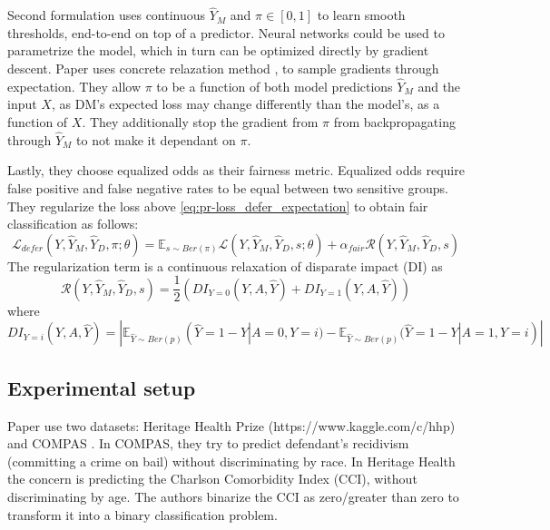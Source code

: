 \documentclass[11pt,a4paper,final]{article}
\begin{document}
Second formulation uses continuous $\hat{Y}_M$ and $\pi \in [0,1]$ to learn smooth thresholds, end-to-end on top of a predictor. Neural networks could be used to parametrize the model, which in turn can be optimized directly by gradient descent. Paper uses concrete relazation method \citep{jang2016categorical}, \citep{maddison2016concrete} to sample gradients through expectation. They allow $\pi$ to be a function of both model predictions $\hat{Y}_M$ and the input $X$, as DM's expected loss may change differently than the model's, as a function of $X$. They additionally stop the gradient from $\pi$ from backpropagating through $\hat{Y}_M$ to not make it dependant on $\pi$.

Lastly, they choose equalized odds \citep{hardt2016equality} as their fairness metric. Equalized odds require false positive and false negative rates to be equal between two sensitive groups. They regularize the loss above \eqref{eq:pr-loss_defer_expectation} to obtain fair classification as follows:
\begin{equation}
    \mathcal{L}_{defer}(Y,\hat{Y}_M, \hat{Y}_D, \pi; \theta) = \mathbb{E}_{s \sim Ber(\pi)} \mathcal{L}(Y,\hat{Y}_M, \hat{Y}_D, s; \theta) + \alpha_{fair} \mathcal{R}(Y, \hat{Y}_M, \hat{Y}_D, s)
\end{equation}
The regularization term is a continuous relaxation of disparate impact (DI) as
\begin{equation}
    \mathcal{R}(Y, \hat{Y}_M, \hat{Y}_D, s) = \frac{1}{2} (DI_{Y=0}(Y,A,\hat{Y}) + DI_{Y=1}(Y,A,\hat{Y}))
\end{equation}
where
\small{
\begin{equation}
    DI_{Y=i}(Y,A,\hat{Y}) = | \mathbb{E}_{\hat{Y}\sim Ber(p)} (\hat{Y}=1-Y|A=0,Y=i) - \mathbb{E}_{\hat{Y}\sim Ber(p)} (\hat{Y}=1-Y|A=1,Y=i) |
\end{equation}
}

\subsection{Experimental setup}
Paper use two datasets: Heritage Health Prize (https://www.kaggle.com/c/hhp) and COMPAS \citep{larson2016we}. In COMPAS, they try to predict defendant's recidivism (committing a crime on bail) without discriminating by race. In Heritage Health the concern is predicting the Charlson Comorbidity Index (CCI), without discriminating by age. The authors binarize the CCI as zero/greater than zero to transform it into a binary classification problem.
\end{document}
